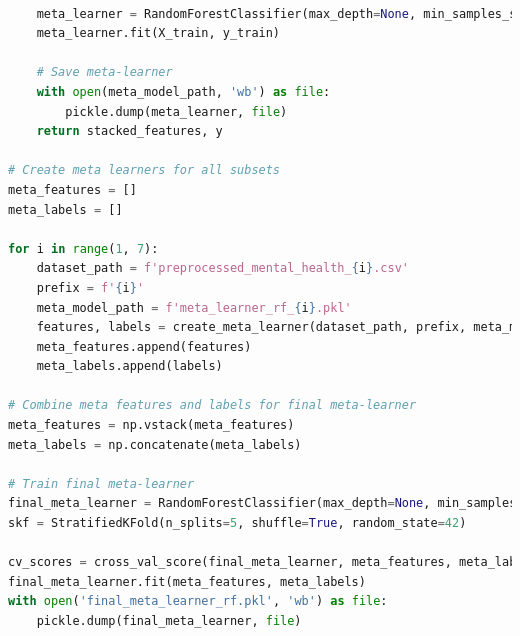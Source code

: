    \begin{tcolorbox}[colback=gray!5!white, colframe=gray!80!black, boxrule=0.5pt, title=Hierarchical Ensemble Model 1] 
        \begin{lstlisting}[language=Python]
    
    meta_learner = RandomForestClassifier(max_depth=None, min_samples_split=20, min_samples_leaf=1,max_features='sqrt', bootstrap=False, random_state=42)
    meta_learner.fit(X_train, y_train)

    # Save meta-learner
    with open(meta_model_path, 'wb') as file:
        pickle.dump(meta_learner, file)
    return stacked_features, y

# Create meta learners for all subsets
meta_features = []
meta_labels = []

for i in range(1, 7):
    dataset_path = f'preprocessed_mental_health_{i}.csv'
    prefix = f'{i}'
    meta_model_path = f'meta_learner_rf_{i}.pkl'
    features, labels = create_meta_learner(dataset_path, prefix, meta_model_path)
    meta_features.append(features)
    meta_labels.append(labels)

# Combine meta features and labels for final meta-learner
meta_features = np.vstack(meta_features)
meta_labels = np.concatenate(meta_labels)

# Train final meta-learner
final_meta_learner = RandomForestClassifier(max_depth=None, min_samples_split=20, min_samples_leaf=1,max_features='sqrt', bootstrap=False, random_state=42)
skf = StratifiedKFold(n_splits=5, shuffle=True, random_state=42)

cv_scores = cross_val_score(final_meta_learner, meta_features, meta_labels, cv=skf, scoring='accuracy')
final_meta_learner.fit(meta_features, meta_labels)
with open('final_meta_learner_rf.pkl', 'wb') as file:
    pickle.dump(final_meta_learner, file)
\end{lstlisting}
\end{tcolorbox}

